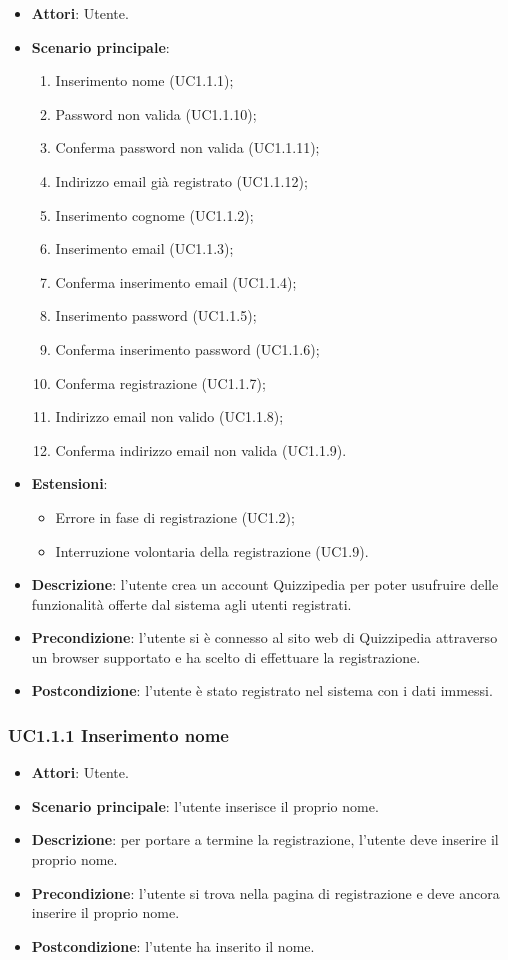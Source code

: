 \begin{itemize}
\item \textbf{Attori}: Utente.
\item \textbf{Scenario principale}:
\begin{enumerate}
\item Inserimento nome (UC1.1.1);
\item Password non valida (UC1.1.10);
\item Conferma password non valida (UC1.1.11);
\item Indirizzo email già registrato (UC1.1.12);
\item Inserimento cognome (UC1.1.2);
\item Inserimento email (UC1.1.3);
\item Conferma inserimento email (UC1.1.4);
\item Inserimento password (UC1.1.5);
\item Conferma inserimento password (UC1.1.6);
\item Conferma registrazione (UC1.1.7);
\item Indirizzo email non valido (UC1.1.8);
\item Conferma indirizzo email non valida (UC1.1.9).
\end{enumerate}
\item \textbf{Estensioni}:
\begin{itemize}
\item Errore in fase di registrazione (UC1.2);
\item Interruzione volontaria della registrazione (UC1.9).
\end{itemize}
\item \textbf{Descrizione}: l'utente crea un account Quizzipedia per poter usufruire delle funzionalità offerte dal sistema agli utenti registrati.
\item \textbf{Precondizione}: l'utente si è connesso al sito web di Quizzipedia attraverso un browser supportato e ha scelto di effettuare la registrazione.
\item \textbf{Postcondizione}: l'utente è stato registrato nel sistema con i dati immessi.
\end{itemize}
\subsubsection{UC1.1.1 Inserimento nome}
\begin{itemize}
\item \textbf{Attori}: Utente.
\item \textbf{Scenario principale}: l'utente inserisce il proprio nome.
\item \textbf{Descrizione}: per portare a termine la registrazione, l'utente deve inserire il proprio nome.
\item \textbf{Precondizione}: l'utente si trova nella pagina di registrazione e deve ancora inserire il proprio nome.
\item \textbf{Postcondizione}: l'utente ha inserito il nome.
\end{itemize}
